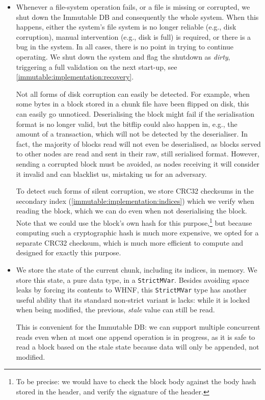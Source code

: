 \begin{itemize}
\item Whenever a file-system operation fails, or a file is missing or corrupted,
  we shut down the Immutable DB and consequently the whole system. When this
  happens, either the system's file system is no longer reliable (e.g., disk
  corruption), manual intervention (e.g., disk is full) is required, or there is
  a bug in the system. In all cases, there is no point in trying to continue
  operating. We shut down the system and flag the shutdown as \emph{dirty},
  triggering a full validation on the next start-up, see
  \cref{immutable:implementation:recovery}.

  Not all forms of disk corruption can easily be detected. For example, when
  some bytes in a block stored in a chunk file have been flipped on disk, this
  can easily go unnoticed. Deserialising the block might fail if the
  serialisation format is no longer valid, but the bitflip could also happen in,
  e.g., the amount of a transaction, which will not be detected by the
  deserialiser. In fact, the majority of blocks read will not even be
  deserialised, as blocks served to other nodes are read and sent in their raw,
  still serialised format. However, sending a corrupted block must be avoided,
  as nodes receiving it will consider it invalid and can blacklist us, mistaking
  us for an adversary.

  To detect such forms of silent corruption, we store CRC32 checksums in the
  secondary index (\cref{immutable:implementation:indices}) which we verify when
  reading the block, which we can do even when not deserialising the block. Note
  that we could use the block's own hash for this purpose,\footnote{To be
  precise: we would have to check the block body against the body hash stored in
  the header, and verify the signature of the header.} but because computing
  such a cryptographic hash is much more expensive, we opted for a separate
  CRC32 checksum, which is much more efficient to compute and designed for
  exactly this purpose.

\item We store the state of the current chunk, including its indices, in memory.
  We store this state, a pure data type, in a \lstinline!StrictMVar!. Besides
  avoiding space leaks by forcing its contents to WHNF, this
  \lstinline!StrictMVar! type has another useful ability that its standard
  non-strict variant is lacks: while it is locked when being modified, the
  previous, \emph{stale} value can still be read.

  This is convenient for the Immutable DB: we can support multiple concurrent
  reads even when at most one append operation is in progress, as it is safe to
  read a block based on the stale state because data will only be appended, not
  modified.


\end{itemize}
